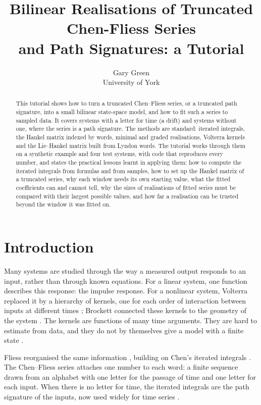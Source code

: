 \documentclass[11pt,a4paper]{article}
\title{Bilinear Realisations of Truncated Chen-Fliess Series\\ and Path Signatures: a Tutorial}
\author{Gary Green\\University of York}
\date{}
\theoremstyle{remark}
\begin{document}
\maketitle

\begin{abstract}
This tutorial shows how to turn a truncated Chen--Fliess series, or a truncated path signature, into a small bilinear state-space model, and how to fit such a series to sampled data.
It covers systems with a letter for time (a drift) and systems without one, where the series is a path signature.
The methods are standard: iterated integrals, the Hankel matrix indexed by words, minimal and graded realisations, Volterra kernels and the Lie--Hankel matrix built from Lyndon words.
The tutorial works through them on a synthetic example and four test systems, with code that reproduces every number, and states the practical lessons learnt in applying them: how to compute the iterated integrals from formulas and from samples, how to set up the Hankel matrix of a truncated series, why each window needs its own starting value, what the fitted coefficients can and cannot tell, why the sizes of realisations of fitted series must be compared with their largest possible values, and how far a realisation can be trusted beyond the window it was fitted on.
\end{abstract}

\section{Introduction}
Many systems are studied through the way a measured output responds to an input, rather than through known equations.
For a linear system, one function describes this response: the impulse response.
For a nonlinear system, Volterra replaced it by a hierarchy of kernels, one for each order of interaction between inputs at different times \cite{Volterra1930}; Brockett connected these kernels to the geometry of the system \cite{Brockett1976}.
The kernels are functions of many time arguments.
They are hard to estimate from data, and they do not by themselves give a model with a finite state \cite{WrayGreen1994}.

Fliess reorganised the same information \cite{Fliess1981}, building on Chen's iterated integrals \cite{Chen1957}.
The Chen--Fliess series attaches one number to each word: a finite sequence drawn from an alphabet with one letter for the passage of time and one letter for each input.
When there is no letter for time, the iterated integrals are the path signature of the inputs, now used widely for time series \cite{Lyons1998,FrizVictoir2010,ChevyrevKormilitzin2016}.
\end{document}
